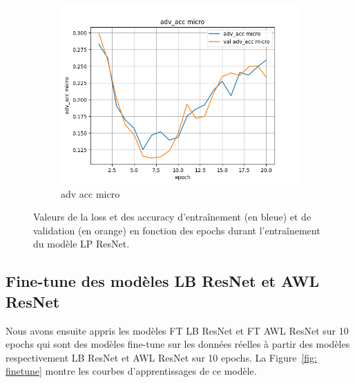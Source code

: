\documentclass[a4paper]{article}
\begin{document}
\begin{figure}[ht]
\begin{subfigure}{0.32\textwidth}
        \includegraphics[width=\linewidth]{../logs/adv_img256_1/adv_acc micro.png}
        \caption{adv acc micro}
    \end{subfigure}
    \caption{Valeurs de la loss et des accuracy d'entraînement (en bleue) et de validation (en orange) en fonction des epochs durant l'entraînement du modèle LP ResNet.}
    \label{fig: train adv}
\end{figure}

\subsection{Fine-tune des modèles LB ResNet et AWL ResNet}
Nous avons ensuite appris les modèles FT LB ResNet et FT AWL ResNet sur 10 epochs qui sont des modèles fine-tune sur les données réelles à partir des modèles respectivement LB ResNet et AWL ResNet sur 10 epochs. La Figure~\ref{fig: finetune} montre les courbes d'apprentissages de ce modèle.
\end{document}
